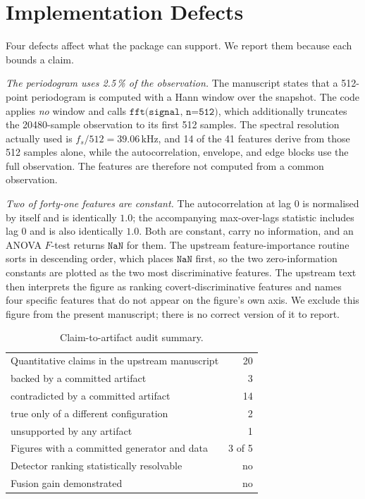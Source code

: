 \documentclass[conference]{IEEEtran}
\begin{document}
\section{Implementation Defects}
\label{sec:defects}

Four defects affect what the package can support. We report them because each bounds a claim.

\emph{The periodogram uses 2.5\,\% of the observation.} The manuscript states that a 512-point periodogram is computed with a Hann window over the snapshot. The code applies \emph{no} window and calls $\texttt{fft(signal, n=512)}$, which additionally truncates the 20480-sample observation to its first 512 samples. The spectral resolution actually used is $f_s/512=39.06$\,kHz, and 14 of the 41 features derive from those 512 samples alone, while the autocorrelation, envelope, and edge blocks use the full observation. The features are therefore not computed from a common observation.

\emph{Two of forty-one features are constant.} The autocorrelation at lag 0 is normalised by itself and is identically $1.0$; the accompanying max-over-lags statistic includes lag 0 and is also identically $1.0$. Both are constant, carry no information, and an ANOVA $F$-test returns $\texttt{NaN}$ for them. The upstream feature-importance routine sorts in descending order, which places $\texttt{NaN}$ first, so the two zero-information constants are plotted as the two most discriminative features. The upstream text then interprets the figure as ranking covert-discriminative features and names four specific features that do not appear on the figure's own axis. We exclude this figure from the present manuscript; there is no correct version of it to report.

\begin{table}[t]
\centering
\caption{Claim-to-artifact audit summary.}
\label{tab:summary}
\small
\begin{tabular}{>{\raggedright\arraybackslash}p{}r}
\toprule
Quantitative claims in the upstream manuscript & 20 \\
\quad backed by a committed artifact & 3 \\
\quad contradicted by a committed artifact & 14 \\
\quad true only of a different configuration & 2 \\
\quad unsupported by any artifact & 1 \\
Figures with a committed generator and data & 3 of 5 \\
Detector ranking statistically resolvable & no \\
Fusion gain demonstrated & no \\
\bottomrule
\end{tabular}
\end{table}
\end{document}
